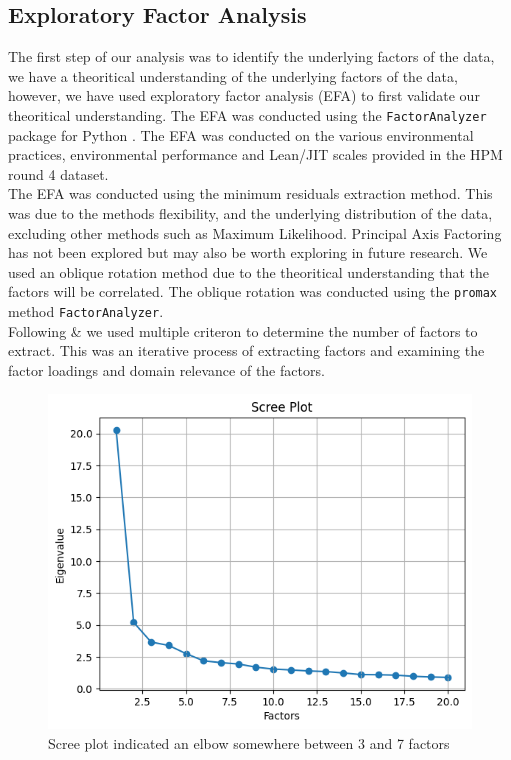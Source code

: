 \subsection*{Exploratory Factor Analysis}
The first step of our analysis was to identify the underlying factors of the data, we have a theoritical understanding of the underlying factors of the data, however, we have used exploratory factor analysis (EFA) to first validate our theoritical understanding.
The EFA was conducted using the \texttt{FactorAnalyzer} package for Python \citep{perssonPythonPackagesExploratory2021}.
The EFA was conducted on the various environmental practices, environmental performance and Lean/JIT scales provided in the HPM round 4 dataset.
\\
The EFA was conducted using the minimum residuals extraction method. This was due to the methods flexibility, and the underlying distribution of the data, excluding other methods such as Maximum Likelihood. 
Principal Axis Factoring has not been explored but may also be worth exploring in future research.
We used an oblique rotation method due to the theoritical understanding that the factors will be correlated.
The oblique rotation was conducted using the \texttt{promax} method \texttt{FactorAnalyzer}.
\\
Following \cite{schonrock-ademaNecessaryStepsFactor2009} \& \cite{costelloBestPracticesExploratory2005} we used multiple criteron to determine the number of factors to extract.
This was an iterative process of extracting factors and examining the factor loadings and domain relevance of the factors.
\\
\begin{figure}[htbp]
    \centering
    \includegraphics[width=\textwidth]{figures/scree.png}
    \caption{Scree plot indicated an elbow somewhere between 3 and 7 factors}
    \label{fig:model}
\end{figure}
